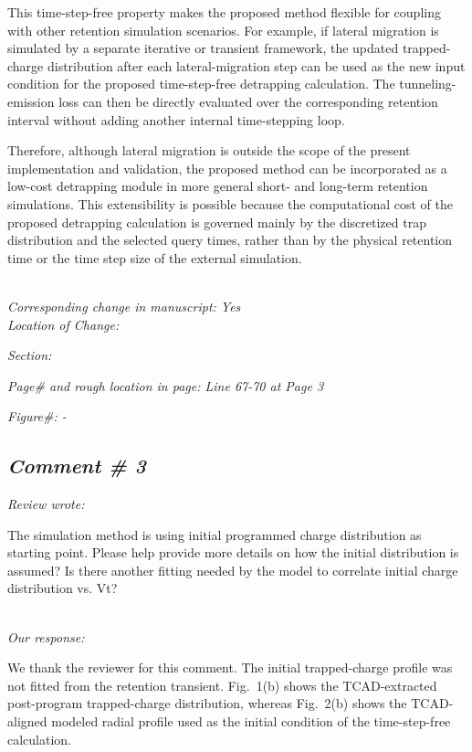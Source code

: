 \documentclass[11pt]{article}
\begin{document}
This time-step-free property makes the proposed method flexible for coupling with other retention simulation scenarios.
For example, if lateral migration is simulated by a separate iterative or transient framework, the updated trapped-charge distribution after each lateral-migration step can be used as the new input condition for the proposed time-step-free detrapping calculation.
The tunneling-emission loss can then be directly evaluated over the corresponding retention interval without adding another internal time-stepping loop.

Therefore, although lateral migration is outside the scope of the present implementation and validation, the proposed method can be incorporated as a low-cost detrapping module in more general short- and long-term retention simulations.
This extensibility is possible because the computational cost of the proposed detrapping calculation is governed mainly by the discretized trap distribution and the selected query times, rather than by the physical retention time or the time step size of the external simulation.

\noindent \textit{\\Corresponding change in manuscript: Yes \\Location of Change:}

\hspace{40pt} \noindent \textit{Section: \uppercase\expandafter{}}

\hspace{40pt} \noindent \textit{Page\# and rough location in page: Line 67-70 at Page 3}

\hspace{40pt} \noindent \textit{Figure\#: - }

\subsection*{\textit{Comment \# 3}}

\noindent \textit{Review wrote: }

The simulation method is using initial programmed charge distribution as starting point.
Please help provide more details on how the initial distribution is assumed?
Is there another fitting needed by the model to correlate initial charge distribution vs. Vt?

\noindent \textit{\\Our response: }

We thank the reviewer for this comment.
The initial trapped-charge profile was not fitted from the retention transient.
Fig.~1(b) shows the TCAD-extracted post-program trapped-charge distribution, whereas Fig.~2(b) shows the TCAD-aligned modeled radial profile used as the initial condition of the time-step-free calculation.
\end{document}
